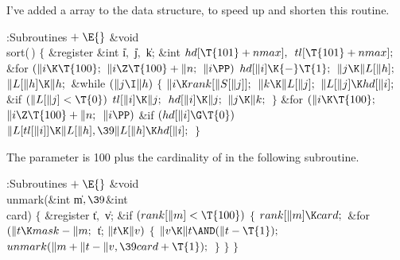I've added a  array to the data structure, to speed up and
shorten
this routine.

\Y\B\4:Subroutines\X${}\mathrel+\E{}$\6
\&{void} \\{sort}(\,)\1\1\2\2\6
${}\{{}$\1\6
\&{register} \&{int} \|i${},{}$ \|j${},{}$ \|k;\6
\&{int} ${}\\{hd}[\T{101}+\\{nmax}],{}$ ${}\\{tl}[\T{101}+\\{nmax}];{}$\7
\&{for} ${}(\|i\K\T{100};{}$ ${}\|i\Z\T{100}+\|n;{}$ ${}\|i\PP){}$\1\5
${}\\{hd}[\|i]\K{-}\T{1};{}$\2\6
${}\|j\K\|L[\|h];{}$\6
${}\|L[\|h]\K\|h;{}$\6
\&{while} ${}(\|j\I\|h){}$\5
${}\{{}$\1\6
${}\|i\K\\{rank}[\|S[\|j]];{}$\6
${}\|k\K\|L[\|j];{}$\6
${}\|L[\|j]\K\\{hd}[\|i];{}$\6
\&{if} ${}(\|L[\|j]<\T{0}){}$\1\5
${}\\{tl}[\|i]\K\|j;{}$\2\6
${}\\{hd}[\|i]\K\|j;{}$\6
${}\|j\K\|k;{}$\6
\4${}\}{}$\2\6
\&{for} ${}(\|i\K\T{100};{}$ ${}\|i\Z\T{100}+\|n;{}$ ${}\|i\PP){}$\1\6
\&{if} ${}(\\{hd}[\|i]\G\T{0}){}$\1\5
${}\|L[\\{tl}[\|i]]\K\|L[\|h],\39\|L[\|h]\K\\{hd}[\|i];{}$\2\2\6
\4${}\}{}$\2\par
\fi

The parameter  is 100 plus the cardinality of 
in the following subroutine.

\Y\B\4:Subroutines\X${}\mathrel+\E{}$\6
\&{void} \\{unmark}(\&{int} \|m${},\39{}$\&{int} \\{card})\1\1\2\2\6
${}\{{}$\1\6
\&{register} \|t${},{}$ \|v;\7
\&{if} ${}(\\{rank}[\|m]<\T{100}){}$\5
${}\{{}$\1\6
${}\\{rank}[\|m]\K\\{card};{}$\6
\&{for} ${}(\|t\K\\{mask}-\|m;{}$ \|t; ${}\|t\K\|v){}$\5
${}\{{}$\1\6
${}\|v\K\|t\AND(\|t-\T{1});{}$\6
${}\\{unmark}(\|m+\|t-\|v,\39\\{card}+\T{1});{}$\6
\4${}\}{}$\2\6
\4${}\}{}$\2\6
\4${}\}{}$\2\par
\fi

